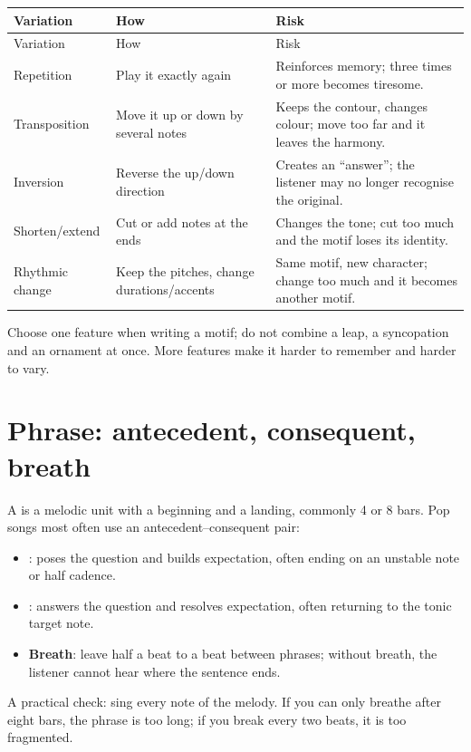 \begin{longtable}{p{}p{}p{}}
\toprule
Variation & How & Risk \\
\midrule
\endfirsthead
\toprule
Variation & How & Risk \\
\midrule
\endhead
Repetition & Play it exactly again & Reinforces memory; three times or more becomes tiresome. \\
Transposition & Move it up or down by several notes & Keeps the contour, changes colour; move too far and it leaves the harmony. \\
Inversion & Reverse the up/down direction & Creates an ``answer''; the listener may no longer recognise the original. \\
Shorten/extend & Cut or add notes at the ends & Changes the tone; cut too much and the motif loses its identity. \\
Rhythmic change & Keep the pitches, change durations/accents & Same motif, new character; change too much and it becomes another motif. \\
\bottomrule
\end{longtable}

Choose one feature when writing a motif; do not combine a leap, a syncopation and an ornament at once. More features make it harder to remember and harder to vary.

\section{Phrase: antecedent, consequent, breath}
\label{sec:phrase}

A  is a melodic unit with a beginning and a landing, commonly 4 or 8 bars. Pop songs most often use an antecedent--consequent pair:

\begin{itemize}
\item \textbf{}: poses the question and builds expectation, often ending on an unstable note or half cadence.
\item \textbf{}: answers the question and resolves expectation, often returning to the tonic target note.
\item \textbf{Breath}: leave half a beat to a beat between phrases; without breath, the listener cannot hear where the sentence ends.
\end{itemize}

A practical check: sing every note of the melody. If you can only breathe after eight bars, the phrase is too long; if you break every two beats, it is too fragmented.

